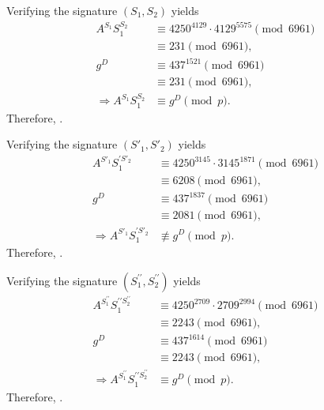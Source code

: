 \documentclass[
  coursecode={MTHE 418},
  assignmentname={Homework \homeworknumber},
  studentnumber=20053722,
  name={Bryan Hoang},
  draft,
]{
  ltxanswer%
}
\begin{document}
  \begin{questions}
    \setcounter{question}{\questionnumber}
    \addtocounter{question}{-1}
    \question[10]
    \begin{solution}
      Verifying the signature \((S_{1}, S_{2})\) yields
      \begin{align*}
        A^{S_{1}} S_{1}^{S_{2}}             &\equiv 4250^{4129} \cdot 4129^{5575} \pmod{6961} \\
                                            &\equiv 231 \pmod{6961},                          \\
        g^{D}                               &\equiv 437^{1521} \pmod{6961}                    \\
                                            &\equiv 231 \pmod{6961},                          \\
        \Rightarrow A^{S_{1}} S_{1}^{S_{2}} &\equiv g^{D} \pmod{p}.
      \end{align*}
      Therefore, .

      Verifying the signature \((S'_{1}, S'_{2})\) yields
      \begin{align*}
        A^{S'_{1}} S_{1}^{\prime S'_{2}}             &\equiv 4250^{3145} \cdot 3145^{1871} \pmod{6961} \\
                                                     &\equiv 6208  \pmod{6961},                        \\
        g^{D}                                        &\equiv 437^{1837} \pmod{6961}                    \\
                                                     &\equiv 2081 \pmod{6961},                         \\
        \Rightarrow A^{S'_{1}} S_{1}^{\prime S'_{2}} &\not\equiv g^{D} \pmod{p}.
      \end{align*}
      Therefore, .

      Verifying the signature \((S_{1}^{\prime\prime}, S_{2}^{\prime\prime})\) yields
      \begin{align*}
        A^{S_{1}^{\prime\prime}} S_{1}^{\prime\prime S_{2}^{\prime\prime}}             &\equiv 4250^{2709} \cdot 2709^{2994} \pmod{6961} \\
                                                                                       &\equiv 2243 \pmod{6961},                         \\
        g^{D}                                                                          &\equiv 437^{1614} \pmod{6961}                    \\
                                                                                       &\equiv 2243 \pmod{6961},                         \\
        \Rightarrow A^{S_{1}^{\prime\prime}} S_{1}^{\prime\prime S_{2}^{\prime\prime}} &\equiv g^{D} \pmod{p}.
      \end{align*}
      Therefore, .
    \end{solution}
  \end{questions}
\end{document}
